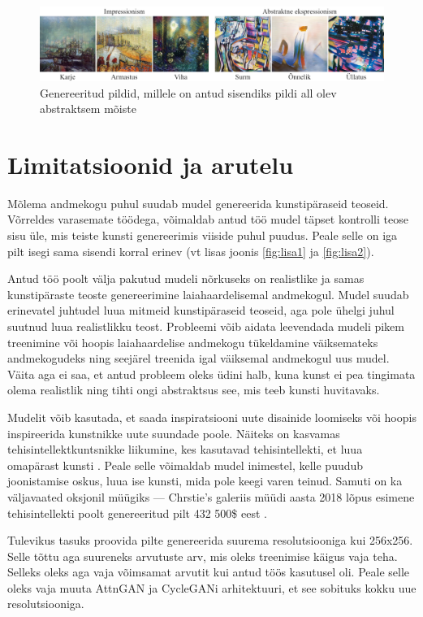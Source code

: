 \documentclass{vilgym}
\begin{document}
	\begin{figure}[ht]
		\includegraphics[width=\linewidth]{images/abstraktne.png}
		\caption{Genereeritud pildid, millele on antud sisendiks pildi all olev abstraktsem mõiste}
		\label{fig:abstract}
	\end{figure}

	\section{Limitatsioonid ja arutelu}

	Mõlema andmekogu puhul suudab mudel genereerida kunstipäraseid teoseid. Võrreldes varasemate töödega, võimaldab antud töö mudel täpset kontrolli teose sisu üle, mis teiste kunsti genereerimis viiside puhul puudus. Peale selle on iga pilt isegi sama sisendi korral erinev (vt lisas joonis \ref{fig:lisa1} ja \ref{fig:lisa2}).

	Antud töö poolt välja pakutud mudeli nõrkuseks on realistlike ja samas kunstipäraste teoste genereerimine laiahaardelisemal andmekogul. Mudel suudab erinevatel juhtudel luua mitmeid kunstipäraseid teoseid, aga pole ühelgi juhul suutnud luua realistlikku teost. Probleemi võib aidata leevendada mudeli pikem treenimine või hoopis laiahaardelise andmekogu tükeldamine väiksemateks andmekogudeks ning seejärel treenida igal väiksemal andmekogul uus mudel. Väita aga ei saa, et antud probleem oleks
	üdini halb, kuna kunst ei pea tingimata olema realistlik ning tihti ongi abstraktsus see, mis teeb kunsti huvitavaks.
	
	Mudelit võib kasutada, et saada inspiratsiooni uute disainide loomiseks või hoopis inspireerida kunstnikke uute suundade poole. Näiteks on kasvamas tehisintellektkuntsnikke liikumine, kes kasutavad tehisintellekti, et luua omapärast kunsti \parencite{aiartist}. Peale selle võimaldab mudel inimestel, kelle puudub joonistamise oskus, luua ise kunsti, mida pole keegi varen teinud. Samuti on ka väljavaated oksjonil müügiks --- Chrstie's galeriis müüdi aasta 2018 lõpus esimene tehisintellekti poolt genereeritud pilt 432 500\$ eest \parencite{art_sold}.
	
	Tulevikus tasuks proovida pilte genereerida suurema resolutsiooniga kui 256x256. Selle tõttu aga suureneks arvutuste arv, mis oleks treenimise käigus vaja teha. Selleks oleks aga vaja võimsamat arvutit kui antud töös kasutusel oli. Peale selle oleks vaja muuta AttnGAN ja CycleGANi arhitektuuri, et see sobituks kokku uue resolutsiooniga.
	
\end{document}
